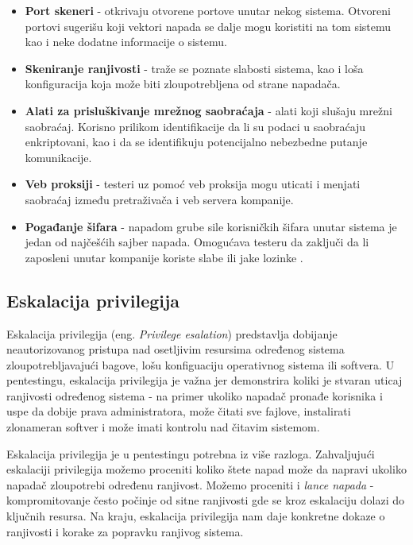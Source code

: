 \documentclass[a4paper,12pt]{article}
\begin{document}
\begin{itemize}
\item \textbf{Port skeneri} - otkrivaju otvorene portove unutar nekog sistema. Otvoreni portovi sugerišu koji vektori napada se dalje mogu koristiti na tom sistemu kao i neke dodatne informacije o sistemu.
  \item \textbf{Skeniranje ranjivosti} - traže se poznate slabosti sistema, kao i loša konfiguracija koja može biti zloupotrebljena od strane napadača. 
  \item \textbf{Alati za prisluškivanje mrežnog saobraćaja} - alati koji slušaju mrežni saobraćaj. Korisno prilikom identifikacije da li su podaci u saobraćaju enkriptovani, kao i da se identifikuju potencijalno nebezbedne putanje komunikacije.
  \item \textbf{Veb proksiji} - testeri uz pomoć veb proksija mogu uticati i menjati saobraćaj između pretraživača i veb servera kompanije. 
  \item \textbf{Pogađanje šifara} - napadom grube sile korisničkih šifara unutar sistema je jedan od najčešćih sajber napada. Omogućava testeru da zaključi da li zaposleni unutar kompanije koriste slabe ili jake lozinke \cite{pentesting-tools}. 
\end{itemize}

\subsection{Eskalacija privilegija}

Eskalacija privilegija (eng. \textit{Privilege esalation}) predstavlja dobijanje neautorizovanog pristupa nad osetljivim resursima određenog sistema zloupotrebljavajući bagove, lošu konfiguaciju operativnog sistema ili softvera. U pentestingu, eskalacija privilegija je važna jer demonstrira koliki je stvaran uticaj ranjivosti određenog sistema - na primer ukoliko napadač pronađe korisnika i uspe da dobije prava administratora, može čitati sve fajlove, instalirati zlonameran softver i može imati kontrolu nad čitavim sistemom. 

Eskalacija privilegija je u pentestingu potrebna iz više razloga. Zahvaljujući eskalaciji privilegija možemo proceniti koliko štete napad može da napravi ukoliko napadač zloupotrebi određenu ranjivost. Možemo proceniti i \textit{lance napada} - kompromitovanje često počinje od sitne ranjivosti gde se kroz eskalaciju dolazi do ključnih resursa. Na kraju, eskalacija privilegija nam daje konkretne dokaze o ranjivosti i korake za popravku ranjivog sistema.
\end{document}

